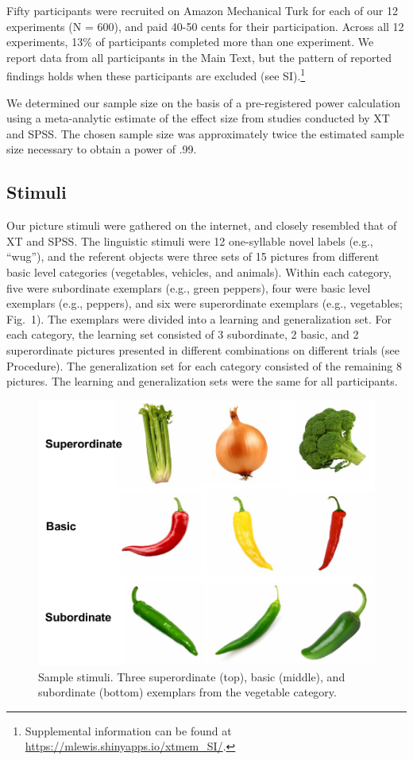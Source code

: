\documentclass[english,floatsintext,man]{apa6}
\theoremstyle{definition}
\theoremstyle{definition}
\theoremstyle{definition}
\theoremstyle{remark}
\begin{document}
Fifty participants were recruited on Amazon Mechanical Turk for each of
our 12 experiments (N = 600), and paid 40-50 cents for their
participation. Across all 12 experiments, 13\% of participants completed
more than one experiment. We report data from all participants in the
Main Text, but the pattern of reported findings holds when these
participants are excluded (see
SI).\footnote{Supplemental information can be found at \url{https://mlewis.shinyapps.io/xtmem_SI/}.}

We determined our sample size on the basis of a pre-registered power
calculation using a meta-analytic estimate of the effect size from
studies conducted by XT and SPSS. The chosen sample size was
approximately twice the estimated sample size necessary to obtain a
power of .99.

\subsection{Stimuli}\label{stimuli}

Our picture stimuli were gathered on the internet, and closely resembled
that of XT and SPSS. The linguistic stimuli were 12 one-syllable novel
labels (e.g., \enquote{wug}), and the referent objects were three sets
of 15 pictures from different basic level categories (vegetables,
vehicles, and animals). Within each category, five were subordinate
exemplars (e.g., green peppers), four were basic level exemplars (e.g.,
peppers), and six were superordinate exemplars (e.g., vegetables;
Fig.~1). The exemplars were divided into a learning and generalization
set. For each category, the learning set consisted of 3 subordinate, 2
basic, and 2 superordinate pictures presented in different combinations
on different trials (see Procedure). The generalization set for each
category consisted of the remaining 8 pictures. The learning and
generalization sets were the same for all participants.

\begin{figure}[t!]

{\centering \includegraphics[width=0.5\linewidth]{figs/stim} 

}

\caption{Sample stimuli. Three superordinate (top), basic (middle), and subordinate (bottom) exemplars from the vegetable category.}\label{fig:unnamed-chunk-1}
\end{figure}
\end{document}
